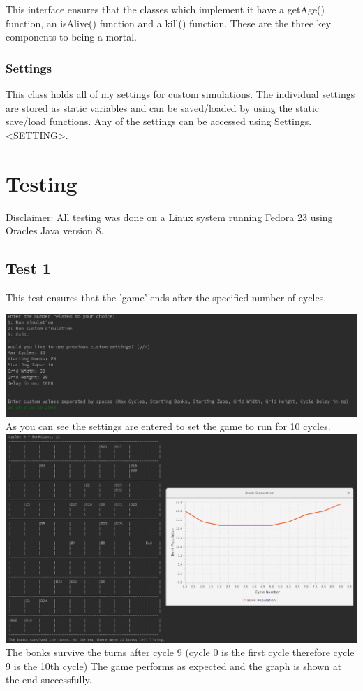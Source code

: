 \documentclass[12pt]{article}
\begin{document}
This interface ensures that the classes which implement it have a getAge() function, an isAlive() function and a kill() function. These are the three key components to being a mortal.

\subsubsection{Settings}
This class holds all of my settings for custom simulations. The individual settings are stored as static variables and can be saved/loaded by using the static save/load functions. Any of the settings can be accessed using Settings.<SETTING>.
  
\section{Testing}
Disclaimer: All testing was done on a Linux system running Fedora 23 using Oracles Java version 8.

\subsection{Test 1}
This test ensures that the 'game' ends after the specified number of cycles.

\includegraphics[width=15cm]{test1a}
As you can see the settings are entered to set the game to run for 10 cycles.\\
\includegraphics[width=15cm]{test1b}
The bonks survive the turns after cycle 9 (cycle 0 is the first cycle therefore cycle 9 is the 10th cycle) The game performs as expected and the graph is shown at the end successfully.
\end{document}
